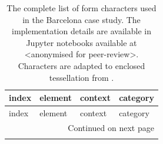 \small
\begin{longtable}{p{5cm}p{4cm}p{4cm}l}
\caption{The complete list of form characters used in the Barcelona case study. The implementation details are available
in Jupyter notebooks available at <anonymised for peer-review>.
Characters are adapted to enclosed tessellation from \cite{fleischmann2021methodological}.}
\label{tab:form_bcn} \\
\toprule
                                   index &                         element &                    context &     category \\
\midrule
\endfirsthead

\toprule
                               index &                         element &                    context &     category \\
\midrule
\endhead
\midrule
\multicolumn{4}{r}{{Continued on next page}} \\
\midrule
\endfoot


\end{longtable}
